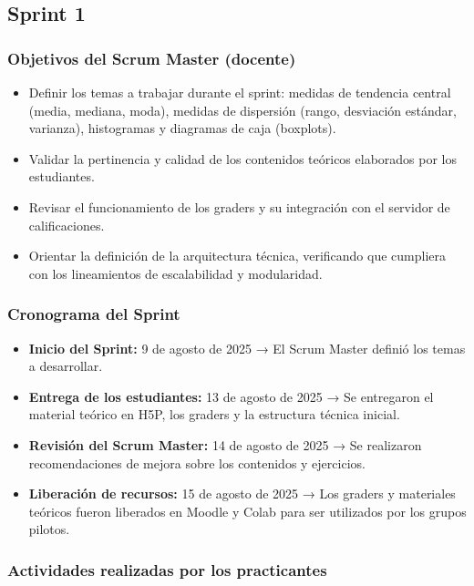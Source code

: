 \documentclass[letter,oneside,12pt,spanish]{report}
\begin{document}
\subsection{Sprint 1}

\subsubsection*{Objetivos del Scrum Master (docente)}
\begin{itemize}
	\item Definir los temas a trabajar durante el sprint: medidas de tendencia central (media, mediana, moda), medidas de dispersión (rango, desviación estándar, varianza), histogramas y diagramas de caja (boxplots).
	\item Validar la pertinencia y calidad de los contenidos teóricos elaborados por los estudiantes.
	\item Revisar el funcionamiento de los graders y su integración con el servidor de calificaciones.
	\item Orientar la definición de la arquitectura técnica, verificando que cumpliera con los lineamientos de escalabilidad y modularidad.
\end{itemize}

\subsubsection*{Cronograma del Sprint}
\begin{itemize}
	\item \textbf{Inicio del Sprint:} 9 de agosto de 2025 → El Scrum Master definió los temas a desarrollar.
	\item \textbf{Entrega de los estudiantes:} 13 de agosto de 2025 → Se entregaron el material teórico en H5P, los graders y la estructura técnica inicial.
	\item \textbf{Revisión del Scrum Master:} 14 de agosto de 2025 → Se realizaron recomendaciones de mejora sobre los contenidos y ejercicios.
	\item \textbf{Liberación de recursos:} 15 de agosto de 2025 → Los graders y materiales teóricos fueron liberados en Moodle y Colab para ser utilizados por los grupos pilotos.
\end{itemize}

\subsubsection*{Actividades realizadas por los practicantes}
\end{document}
